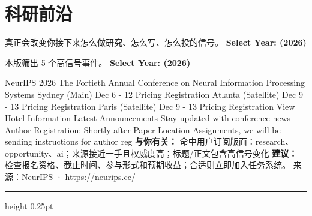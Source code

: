 \documentclass[10.5pt]{ctexart}
\begin{document}
\section*{科研前沿}
{\color{ormuted} 真正会改变你接下来怎么做研究、怎么写、怎么投的信号。}
\vspace{2mm}
{\LARGE\bfseries Select Year: (2026)}\par
\vspace{1mm}
{\color{ormuted} 本版筛出 5 个高信号事件。}
\vspace{3mm}
{\Large\bfseries Select Year: (2026)}\par
NeurIPS 2026 The Fortieth Annual Conference on Neural Information Processing Systems Sydney (Main) Dec 6 - 12 Pricing Registration Atlanta (Satellite) Dec 9 - 13 Pricing Registration Paris (Satellite) Dec 9 - 13 Pricing Registration View Hotel Information Latest Announcements Stay updated with conference news Author Registration: Shortly after Paper Location Assignments, we will be sending instructions for author reg
\textbf{与你有关：} 命中用户订阅版面：research、opportunity、ai；来源接近一手且权威度高；标题/正文包含高信号变化
\textbf{建议：} 检查报名资格、截止时间、参与形式和预期收益；合适则立即加入任务系统。
{\footnotesize\color{ormuted} 来源：NeurIPS · \url{https://neurips.cc/}}
\vspace{4mm}
\hrule height 0.25pt
\vspace{3mm}
\end{document}
